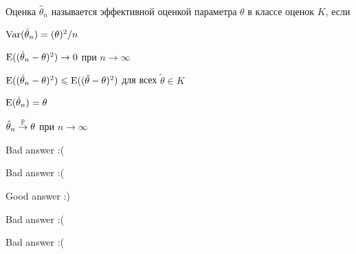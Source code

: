 
\begin{question}
Оценка \(\hat \theta_n\) называется эффективной оценкой параметра
\(\theta\) в классе оценок \(K\), если
\begin{answerlist}
  \item \(\Var(\hat \theta_n)=(\theta)^2/n\)
  \item \(\E((\hat \theta_n - \theta)^2) \stackrel{}{\to} 0\) при
\(n\stackrel{}{\to} \infty\)
  \item \(\E((\hat \theta_n - \theta)^2) \leq \E((\tilde \theta - \theta)^2)\)
для всех \(\tilde \theta \in K\)
  \item \(\E(\hat \theta_n)=\theta\)
  \item \(\hat \theta_n \stackrel{\P}{\to} \theta\) при
\(n\stackrel{}{\to} \infty\)
\end{answerlist}
\end{question}

\begin{solution}
\begin{answerlist}
  \item Bad answer :(
  \item Bad answer :(
  \item Good answer :)
  \item Bad answer :(
  \item Bad answer :(
\end{answerlist}
\end{solution}

